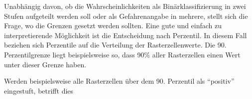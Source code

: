Unabhängig davon, ob die Wahrscheinlichkeiten als Binärklassifizierung in zwei Stufen aufgeteilt werden soll oder als Gefahrenangabe in mehrere, stellt sich die Frage, wo die Grenzen gesetzt werden sollten.
Eine gute und einfach zu interpretierende Möglichkeit ist die Entscheidung nach Perzentil.
In diesem Fall beziehen sich Perzentile auf die Verteilung der Rasterzellenwerte.
Die 90. Perzentilgrenze liegt beispielsweise so, dass 90\% aller Rasterzellen einen Wert unter dieser Grenze haben.

Werden beispielsweise alle Rasterzellen über dem 90. Perzentil als "`positiv"' eingestuft, betrifft dies 

